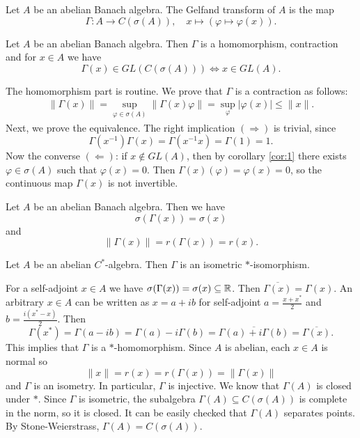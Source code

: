 \begin{definition}
  Let $A$ be an abelian Banach algebra. The Gelfand transform of $A$ is the map 
  $$\Gamma: A \to C(\sigma(A)),\quad x \mapsto (\varphi \mapsto \varphi(x)).$$
\end{definition}

\begin{theorem}
  Let $A$ be an abelian Banach algebra. Then $\Gamma$ is a homomorphism, contraction and for 
  $x \in A$ we have $$\Gamma(x) \in GL(C(\sigma (A))) \Leftrightarrow x \in GL(A).$$
\end{theorem}

\begin{myproof}
  The homomorphism part is routine. We prove that $\Gamma$ is a contraction as follows:
  \begin{align*}
    \| \Gamma(x)\| = \sup_{\varphi \in \sigma (A)} \| \Gamma(x) \varphi\| = \sup_{\varphi} |\varphi(x)| \leq \|x\|.
  \end{align*}
  Next, we prove the equivalence. The right implication $(\Rightarrow)$ is trivial, since 
  $$\Gamma(x^{-1}) \Gamma(x) = \Gamma(x^{-1} x) = \Gamma(1) = 1.$$
  Now the converse $(\Leftarrow)$: if $x \notin GL(A)$,
  then by corollary \ref{cor:1} there exists $\varphi \in \sigma(A)$ such that $\varphi(x) = 0$.
  Then $\Gamma(x) (\varphi) = \varphi(x) = 0$, so the continuous map $\Gamma(x)$ is not invertible.
\end{myproof}

\begin{corollary}
  Let $A$ be an abelian Banach algebra. Then 
  we have $$\sigma (\Gamma(x)) = \sigma (x)$$
  and $$\| \Gamma(x)\| = r (\Gamma(x)) = r(x).$$
\end{corollary}

\begin{theorem}[Gelfand]
  Let $A$ be an abelian $C^*$-algebra. Then $\Gamma$ is an isometric $*$-isomorphism.
\end{theorem}

\begin{myproof}
  For a self-adjoint $x \in A$ we have $\sigma (\Gamma(x)) = \sigma(x) \subseteq \mathbb {R}$.
  Then $\overline{\Gamma(x)} = \Gamma(x)$. An arbitrary $x \in A$ can be written as $x = a + ib$
  for self-adjoint $a= \frac{x + x^*}{2}$ and $b = \frac{i(x^* - x)}{2}$.
  Then $$\Gamma(x^*) = \Gamma(a - ib) = \Gamma(a) - i \Gamma(b) = \overline{\Gamma(a) + i \Gamma(b)} = \overline{\Gamma(x)}.$$
  This implies that $\Gamma$ is a $*$-homomorphism.
  Since $A$ is abelian, each $x \in A$ is normal so 
  $$\| x\| = r(x) = r(\Gamma(x)) = \|\Gamma(x)\|$$
  and $\Gamma$ is an isometry.
  In particular, $\Gamma$ is injective. We know that $\Gamma(A)$ is closed under $*$. Since $\Gamma$
  is isometric, the subalgebra $\Gamma(A) \subseteq C(\sigma(A))$ is complete in the norm, so it is closed. It can be easily checked that $\Gamma (A)$ separates points.
  By Stone-Weierstrass, $\Gamma(A) = C(\sigma(A))$.
\end{myproof}

